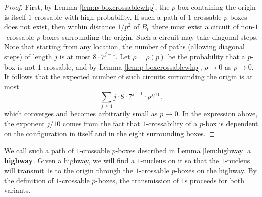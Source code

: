 \documentclass{article}
\numberwithin{equation}{section}
\newtheorem{lemma}[theorem]{Lemma}
\newcommand{\note}[1]{{\bf \textcolor{blue}
{[#1\marginpar{\textcolor{red}{***}}]}}}
\begin{document}
\begin{proof}
    First, by Lemma \ref{lem:p-boxcrossablewhp}, the $p$-box containing the origin is itself $1$-crossable with high probability.
    If such a path of $1$-crossable $p$-boxes does not exist, then within distance $1/p^2$ of $B_0$ there must exist a circuit of non-$1$-crossable $p$-boxes surrounding the origin.
    Such a circuit may take diagonal steps.
    Note that starting from any location, the number of paths (allowing diagonal steps) of length $j$ is at most $8 \cdot 7^{j-1}$.
    Let $\rho = \rho(p)$ be the probability that a $p$-box is not $1$-crossable, and by Lemma \ref{lem:p-boxcrossablewhp}, $\rho \to 0$ as $p \to 0$.
    It follows that the expected number of such circuits surrounding the origin is at most
    \[
    \sum_{j \geq 4} j \cdot 8 \cdot 7^{j-1} \cdot \rho^{j/10},
    \]
    which converges and becomes arbitrarily small as $p \to 0$. In the expression above, the exponent $j/10$ comes from the fact that $1$-crossability of a $p$-box is dependent on the configuration in itself and in the eight surrounding boxes.
\end{proof}




We call such a path of $1$-crossable $p$-boxes described in Lemma \ref{lem:highway} a \textbf{highway}.
Given a highway, we will find a $1$-nucleus on it so that the $1$-nucleus will transmit $1$s to the origin through the $1$-crossable $p$-boxes on the highway.
By the definition of $1$-crossable $p$-boxes, the transmission of $1$s proceeds for both variants.
\end{document}
